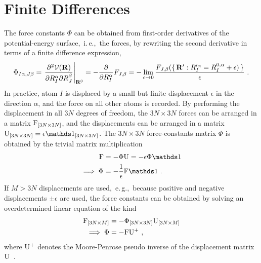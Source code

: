 \newpage

\section{Finite Differences}
The force constants $\Phi$ can be obtained from first-order derivatives of the potential-energy surface,~i.\,e.,~the forces, by rewriting the second derivative in terms of a finite difference expression,
\begin{align}
	\Phi_{I \alpha, J \beta}
		= \left.\frac{\partial^{2} \mathcal{V}(\mathbf{R})}{\partial R_{I}^{\alpha} \partial R_{J}^{\beta}}\right|_{\mathbf{R}^{0}}
		= - \frac{\partial}{\partial R_I^\alpha} F_{J, \beta}
		= - \lim_{\epsilon \to 0}
			\frac{F_{J, \beta} (\set{\b R': R^{\prime \alpha}_I = R^{0, \alpha}_I + \epsilon )}}{\epsilon}
		~.
\label{eq:FC2_finite}
\end{align}
In practice, atom $I$ is displaced by a small but finite displacement $\epsilon$ in the direction $\alpha$, and the force on all other atoms is recorded. By performing the displacement in all $3N$ degrees of freedom, the $3N \times 3N$ forces can be arranged in a matrix ${\rm F}_{[3N \times 3N]}$, and the displacements can be arranged in a matrix ${\rm U}_{[3N \times 3N]} = \epsilon \mathds 1_{[3N \times 3N]}$. The $3N \times 3N$ force-constants matrix $\Phi$ is obtained by the trivial matrix multiplication
\begin{align}
{\rm F }
	&= - \Phi {\rm U} 
	= - \epsilon \Phi \mathds 1
	\label{eq:finite.diff.1}
	\\
	\implies
	\Phi &= - \frac{1}{\epsilon} {\rm F} \mathds 1~.
\end{align}
If $M > 3N$ displacements are used,~e.\,g.,~because positive and negative displacements $\pm \epsilon$ are used, the force constants can be obtained by solving an overdetermined linear equation of the kind
\begin{align}
	{\rm F}_{[3N \times M]} &= - \Phi_{[3N \times 3N]} {\rm U}_{[3N \times M]} \\
	\implies
	\Phi &= - {\rm F} {\rm U}^{+}~,
	\label{eq:phi.pseudo.1}
\end{align}
where ${\rm U}^{+}$ denotes the Moore-Penrose pseudo inverse of the displacement matrix $\rm U$~\cite{Penrose1955,Parlinski1997}.

